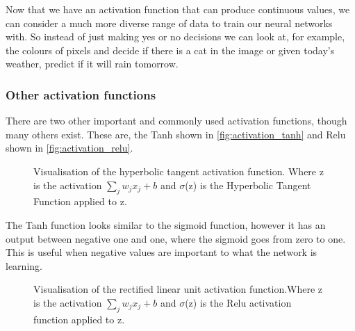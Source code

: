Now that we have an activation function that can produce continuous values, we can consider a much more diverse range of data to train our neural networks with. So instead of just making yes or no decisions we can look at, for example, the colours of pixels and decide if there is a cat in the image or given today's weather, predict if it will rain tomorrow.

\subsubsection{Other activation functions}
There are two other important and commonly used activation functions, though many others exist. These are, the \ac{Tanh} shown in \autoref{fig:activation_tanh} and \ac{Relu} shown in \autoref{fig:activation_relu}.

\begin{figure}
\begin{center}
\caption{Visualisation of the hyperbolic tangent activation function. Where z is the activation $\sum_{j} w_j x_j + b$ and $\sigma$(z) is the Hyperbolic Tangent Function applied to z.}
\label{fig:activation_tanh}
\end{center}
\end{figure}

The \ac{Tanh} function looks similar to the sigmoid function, however it has an output between negative one and one, where the sigmoid goes from zero to one. This is useful when negative values are important to what the network is learning.

\begin{figure}
\begin{center}
\caption{Visualisation of the rectified linear unit activation function.Where z is the activation $\sum_{j} w_j x_j + b$ and $\sigma$(z) is the Relu activation function applied to z.}
\label{fig:activation_relu}
\end{center}
\end{figure}

